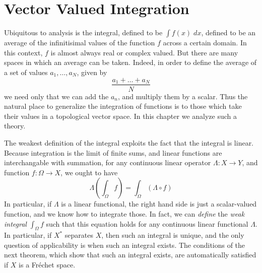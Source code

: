\chapter{Vector Valued Integration}

Ubiquitous to analysis is the integral, defined to be $\int f(x)\; dx$, defined to be an average of the infinitisimal values of the function $f$ across a certain domain. In this context, $f$ is almost always real or complex valued. But there are many spaces in which an average can be taken. Indeed, in order to define the average of a set of values $a_1, \dots, a_N$, given by
%
\[ \frac{a_1 + \dots + a_N}{N} \]
%
we need only that we can add the $a_n$, and multiply them by a scalar. Thus the natural place to generalize the integration of functions is to those which take their values in a topological vector space. In this chapter we analyze such a theory.

The weakest definition of the integral exploits the fact that the integral is linear. Because integration is the limit of finite sums, and linear functions are interchangable with summation, for any continuous linear operator $\Lambda: X \to Y$, and function $f: \Omega \to X$, we ought to have
%
\[ \Lambda \left( \int_\Omega f \right) = \int_\Omega (\Lambda \circ f) \]
%
In particular, if $\Lambda$ is a linear functional, the right hand side is just a scalar-valued function, and we know how to integrate those. In fact, we can {\it define} the \emph{weak integral} $\int_\Omega f$ such that this equation holds for any continuous linear functional $\Lambda$. In particular, if $X^*$ separates $X$, then such an integral is unique, and the only question of applicability is when such an integral exists. The conditions of the next theorem, which show that such an integral exists, are automatically satisfied if $X$ is a Fr\'{e}chet space.

